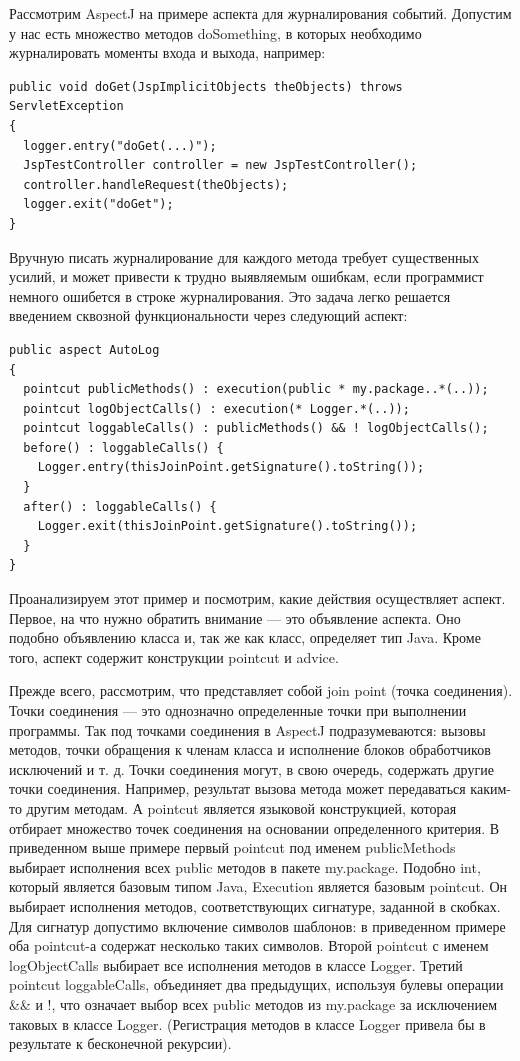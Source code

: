 \documentclass[a4paper,12pt]{article}
\begin{document}
Рассмотрим AspectJ на примере аспекта для журналирования событий. Допустим у
нас есть множество методов doSomething, в которых необходимо журналировать
моменты входа и выхода, например:
\begin{verbatim}
public void doGet(JspImplicitObjects theObjects) throws ServletException 
{
  logger.entry("doGet(...)");
  JspTestController controller = new JspTestController();
  controller.handleRequest(theObjects);
  logger.exit("doGet");
}
\end{verbatim}
Вручную писать журналирование для каждого метода требует существенных усилий, и
может привести к трудно выявляемым ошибкам, если программист немного ошибется
в строке журналирования. Это задача легко решается введением сквозной
функциональности через следующий аспект:
\begin{verbatim}
public aspect AutoLog 
{
  pointcut publicMethods() : execution(public * my.package..*(..));
  pointcut logObjectCalls() : execution(* Logger.*(..));
  pointcut loggableCalls() : publicMethods() && ! logObjectCalls();
  before() : loggableCalls() {
    Logger.entry(thisJoinPoint.getSignature().toString());
  }
  after() : loggableCalls() {
    Logger.exit(thisJoinPoint.getSignature().toString());
  }
}
\end{verbatim}
Проанализируем этот пример и посмотрим, какие действия осуществляет аспект.
Первое, на что нужно обратить внимание — это объявление аспекта. Оно подобно
объявлению класса и, так же как класс, определяет тип Java. Кроме того, аспект
содержит конструкции pointcut и advice.

Прежде всего, рассмотрим, что представляет собой join point (точка соединения).
Точки соединения --- это однозначно определенные точки при выполнении программы.
Так под точками соединения в AspectJ подразумеваются: вызовы методов, точки
обращения к членам класса и исполнение блоков обработчиков исключений и т. д.
Точки соединения могут, в свою очередь, содержать другие точки соединения.
Например, результат вызова метода может передаваться каким-то другим методам. А
pointcut является языковой конструкцией, которая отбирает множество точек
соединения на основании определенного критерия. В приведенном выше примере
первый pointcut под именем publicMethods выбирает исполнения всех public
методов в пакете my.package. Подобно int, который является базовым типом
Java, Execution является базовым pointcut. Он выбирает исполнения методов,
соответствующих сигнатуре, заданной в скобках. Для сигнатур допустимо включение
символов шаблонов: в приведенном примере оба pointcut-а содержат несколько
таких символов. Второй pointcut с именем logObjectCalls выбирает все исполнения
методов в классе Logger. Третий pointcut loggableCalls, объединяет два
предыдущих, используя булевы операции \&\& и !, что означает выбор всех public
методов из my.package за исключением таковых в классе Logger. (Регистрация
методов в классе Logger привела бы в результате к бесконечной рекурсии).
\end{document}
